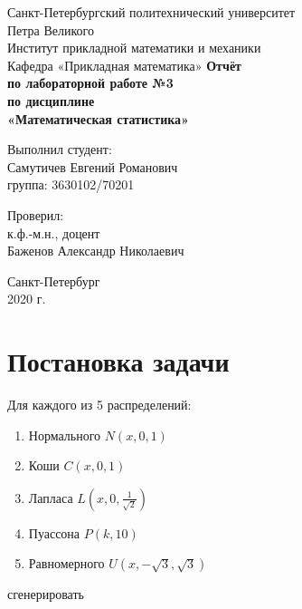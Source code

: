 \documentclass[12pt,a4paper]{article}
\begin{document}
	
\begin{titlepage}
	\begin{center}		
		\vfill	
		Санкт-Петербургский политехнический университет \\
		Петра Великого\\
		\vskip 1cm
		Институт прикладной математики и механики \\
		Кафедра «Прикладная математика»
		\vfill
		\textbf{Отчёт\\
			по лабораторной работе №3\\
			по дисциплине\\
			«Математическая статистика»\\}
		\vfill
	\end{center}
	\vfill
	\hfill
	\begin{minipage}{0.4\textwidth}
		Выполнил студент:\\
		Самутичев Евгений Романович\\
		группа: 3630102/70201\\
	\end{minipage}
	\vfill
	\hfill 
	\begin{minipage}{0.4\textwidth}
		Проверил:\\
		к.ф.-м.н., доцент\\
		Баженов Александр Николаевич\
	\end{minipage}
	\vfill
	\begin{center}
		Санкт-Петербург\\2020 г.
	\end{center}
\end{titlepage}

\tableofcontents
\listoftables
\pagebreak

\section{Постановка задачи}
Для каждого из 5 распределений:

\begin{enumerate}
	\item Нормального $N(x, 0, 1)$
	\item Коши $C(x, 0, 1)$
	\item Лапласа $L(x, 0, \frac{1}{\sqrt{2}})$
	\item Пуассона $P(k, 10)$
	\item Равномерного $U(x, -\sqrt{3}, \sqrt{3})$	
\end{enumerate}

сгенерировать
\pagebreak
\end{document}
